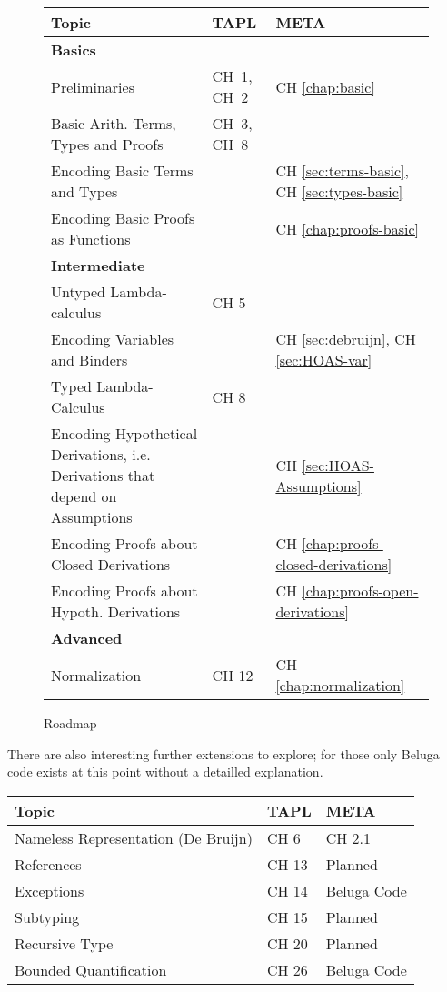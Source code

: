 \begin{figure}
  \centering
\begin{tabular}{p{8cm}|p{2.4cm}|p{3.25cm}}
 Topic & TAPL & META \\
\hline  
\textbf{Basics} & & \\\hline\hline
Preliminaries & CH~1, CH~2 & CH \ref{chap:basic}\\
Basic Arith. Terms, Types and Proofs & CH~3, CH~8 &  \\
\hline  
Encoding Basic Terms and Types & & CH \ref{sec:terms-basic}, CH \ref{sec:types-basic} \\
Encoding Basic Proofs as Functions & & CH \ref{chap:proofs-basic} \\
\hline  \hline
\textbf{Intermediate} & & \\\hline \hline
Untyped Lambda-calculus & CH 5  & \\
Encoding Variables and Binders & & CH \ref{sec:debruijn}, CH \ref{sec:HOAS-var} \\
\hline  
Typed Lambda-Calculus & CH 8  & \\
Encoding Hypothetical Derivations, i.e. Derivations that depend on
Assumptions & & CH \ref{sec:HOAS-Assumptions}\\
Encoding Proofs about Closed Derivations & & CH \ref{chap:proofs-closed-derivations} \\
Encoding Proofs about Hypoth. Derivations & & CH \ref{chap:proofs-open-derivations} \\
\hline\hline
\textbf{Advanced} & & \\\hline \hline
Normalization & CH 12 & CH \ref{chap:normalization}\\
\end{tabular} 
  \caption{Roadmap}
  \label{fig:roadmap}
\end{figure}
There are also interesting further extensions to explore; for those only Beluga code exists at this point without a detailled explanation. 

\begin{center}
\begin{tabular}{p{9cm}|p{2.25cm}|p{2.75cm}}
 Topic & TAPL & META \\
\hline    
Nameless Representation (De Bruijn) & CH 6 & CH 2.1 \\  
References & CH 13 & Planned \\
Exceptions & CH 14 & Beluga Code \\
Subtyping & CH 15 & Planned \\
Recursive Type & CH 20 & Planned\\
Bounded Quantification & CH 26 & Beluga Code \\
\end{tabular}
\end{center}


